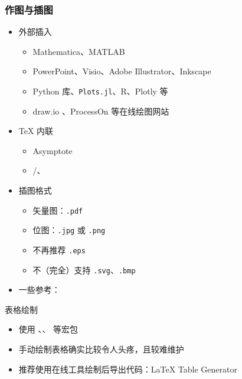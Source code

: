 \begin{frame}[fragile]
  \frametitle{作图与插图}
  \begin{itemize}
    \item 外部插入

          \begin{itemize}
            \item Mathematica、MATLAB
            \item PowerPoint、Visio、Adobe Illustrator、Inkscape
            \item Python  库、\texttt{Plots.jl}、R、Plotly 等
            \item draw.io 、ProcessOn
                   等在线绘图网站
          \end{itemize}

    \item \TeX{} 内联

          \begin{itemize}
            \item Asymptote
            \item \alert{/、}
          \end{itemize}

    \item 插图格式

          \begin{itemize}
            \item 矢量图：\verb|.pdf|
            \item 位图：\verb|.jpg| 或 \verb|.png|
            \item \alert{不再推荐 \texttt{.eps}}
            \item 不（完全）支持 \verb|.svg|、\verb|.bmp|
          \end{itemize}

    \item 一些参考：
  \end{itemize}
\end{frame}

\begin{frame}[fragile]{表格绘制}
  \begin{itemize}
    \item 使用 、、 等宏包
    \item 手动绘制表格确实比较令人头疼，且较难维护
    \item 推荐使用在线工具绘制后导出代码：\LaTeX{} Table Generator
  \end{itemize}
\end{frame}

